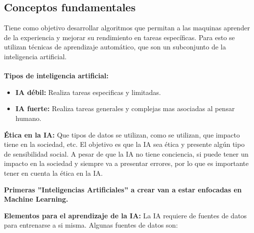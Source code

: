 \documentclass{templateNote}
\begin{document}
\subsection{Conceptos fundamentales}
Tiene como objetivo desarrollar algoritmos que permitan a las maquinas aprender de la experiencia y mejorar su rendimiento en tareas específicas. Para esto se utilizan técnicas de aprendizaje automático, que son un subconjunto de la inteligencia artificial.
\\\\
\textbf{Tipos de inteligencia artificial:}
\begin{itemize}
    \item \textbf{IA débil:} Realiza tareas especificas y limitadas.
    \item \textbf{IA fuerte:} Realiza tareas generales y complejas mas asociadas al pensar humano.
\end{itemize}

\textbf{Ética en la IA:} Que tipos de datos se utilizan, como se utilizan, que impacto tiene en la sociedad, etc. El objetivo es que la IA sea ética y presente algún tipo de sensibilidad social. A pesar de que la IA no tiene conciencia, si puede tener un impacto en la sociedad y siempre va a presentar errores, por lo que es importante tener en cuenta la ética en la IA.

\begin{center}
\end{center}

\begin{tcolorbox}[colback=gray!5!yellow!40,colframe=gray!75!black]
    \textbf{Primeras ''Inteligencias Artificiales'' a crear van a estar enfocadas en Machine Learning.}
\end{tcolorbox}


\textbf{Elementos para el aprendizaje de la IA:} La IA requiere de fuentes de datos para entrenarse a si misma. Algunas fuentes de datos son:
\end{document}
